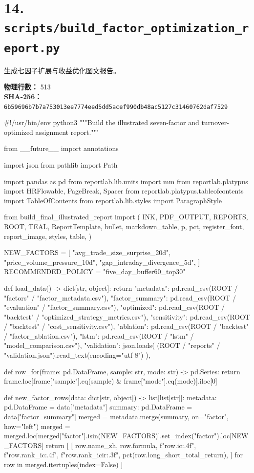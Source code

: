 \documentclass[UTF8,a4paper,fontset=fandol]{ctexart}
\begin{document}
\section{14. \texttt{scripts/build\_factor\_optimization\_report.py}}
生成七因子扩展与收益优化图文报告。

\textbf{物理行数：} 513\\
\textbf{SHA-256：} \texttt{6b59696b7b7a753013ee7774eed5dd5acef990db48ac5127c31460762daf7529}

\begin{ProjectCode}
#!/usr/bin/env python3
"""Build the illustrated seven-factor and turnover-optimized assignment report."""

from __future__ import annotations

import json
from pathlib import Path

import pandas as pd
from reportlab.lib.units import mm
from reportlab.platypus import HRFlowable, PageBreak, Spacer
from reportlab.platypus.tableofcontents import TableOfContents
from reportlab.lib.styles import ParagraphStyle

from build_final_illustrated_report import (
    INK,
    PDF_OUTPUT,
    REPORTS,
    ROOT,
    TEAL,
    ReportTemplate,
    bullet,
    markdown_table,
    p,
    pct,
    register_font,
    report_image,
    styles,
    table,
)


NEW_FACTORS = [
    "avg_trade_size_surprise_20d",
    "price_volume_pressure_10d",
    "gap_intraday_divergence_5d",
]
RECOMMENDED_POLICY = "five_day_buffer60_top30"


def load_data() -> dict[str, object]:
    return {
        "metadata": pd.read_csv(ROOT / "factors" / "factor_metadata.csv"),
        "factor_summary": pd.read_csv(ROOT / "evaluation" / "factor_summary.csv"),
        "optimized": pd.read_csv(ROOT / "backtest" / "optimized_strategy_metrics.csv"),
        "sensitivity": pd.read_csv(ROOT / "backtest" / "cost_sensitivity.csv"),
        "ablation": pd.read_csv(ROOT / "backtest" / "factor_ablation.csv"),
        "lstm": pd.read_csv(ROOT / "lstm" / "model_comparison.csv"),
        "validation": json.loads(
            (ROOT / "reports" / "validation.json").read_text(encoding="utf-8")
        ),
    }


def row_for(frame: pd.DataFrame, sample: str, mode: str) -> pd.Series:
    return frame.loc[frame["sample"].eq(sample) & frame["mode"].eq(mode)].iloc[0]


def new_factor_rows(data: dict[str, object]) -> list[list[str]]:
    metadata: pd.DataFrame = data["metadata"]
    summary: pd.DataFrame = data["factor_summary"]
    merged = metadata.merge(summary, on="factor", how="left")
    merged = merged.loc[merged["factor"].isin(NEW_FACTORS)].set_index("factor").loc[NEW_FACTORS]
    return [
        [
            row.name_zh,
            row.formula,
            f"{row.ic:.4f}",
            f"{row.rank_ic:.4f}",
            f"{row.rank_icir:.3f}",
            pct(row.long_short_total_return),
        ]
        for row in merged.itertuples(index=False)
    ]



\end{ProjectCode}
\end{document}

